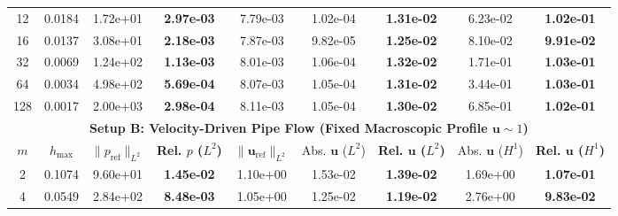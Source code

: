 \documentclass{elsarticle}
\begin{document}
\begin{table}[htbp]
{\begin{tabular}{cc|cc|ccc|cc}
            12  & 0.0184     & 1.72e+01                     & \textbf{2.97e-03}         & 7.79e-03                              & 1.02e-04                  & \textbf{1.31e-02}                  & 6.23e-02                  & \textbf{1.02e-01}                  \\
            16  & 0.0137     & 3.08e+01                     & \textbf{2.18e-03}         & 7.87e-03                              & 9.82e-05                  & \textbf{1.25e-02}                  & 8.10e-02                  & \textbf{9.91e-02}                  \\
            32  & 0.0069     & 1.24e+02                     & \textbf{1.13e-03}         & 8.01e-03                              & 1.06e-04                  & \textbf{1.32e-02}                  & 1.71e-01                  & \textbf{1.03e-01}                  \\
            64  & 0.0034     & 4.98e+02                     & \textbf{5.69e-04}         & 8.07e-03                              & 1.05e-04                  & \textbf{1.31e-02}                  & 3.44e-01                  & \textbf{1.03e-01}                  \\
            128 & 0.0017     & 2.00e+03                     & \textbf{2.98e-04}         & 8.11e-03                              & 1.05e-04                  & \textbf{1.30e-02}                  & 6.85e-01                  & \textbf{1.02e-01}                  \\
            \midrule
            \multicolumn{9}{c}{\textbf{Setup B: Velocity-Driven Pipe Flow (Fixed Macroscopic Profile $\mathbf{u} \sim 1$)}}                                                                                                                                       \\
            \midrule
            $m$ & $h_{\max}$ & $\|p_{\mathrm{ref}}\|_{L^2}$ & \textbf{Rel. $p$ ($L^2$)} & $\|\mathbf{u}_{\mathrm{ref}}\|_{L^2}$ & Abs. $\mathbf{u}$ ($L^2$) & \textbf{Rel. $\mathbf{u}$ ($L^2$)} & Abs. $\mathbf{u}$ ($H^1$) & \textbf{Rel. $\mathbf{u}$ ($H^1$)} \\
            \midrule
            2   & 0.1074     & 9.60e+01                     & \textbf{1.45e-02}         & 1.10e+00                              & 1.53e-02                  & \textbf{1.39e-02}                  & 1.69e+00                  & \textbf{1.07e-01}                  \\
            4   & 0.0549     & 2.84e+02                     & \textbf{8.48e-03}         & 1.05e+00                              & 1.25e-02                  & \textbf{1.19e-02}                  & 2.76e+00                  & \textbf{9.83e-02}                  \\

\end{tabular}}
\end{table}
\end{document}
